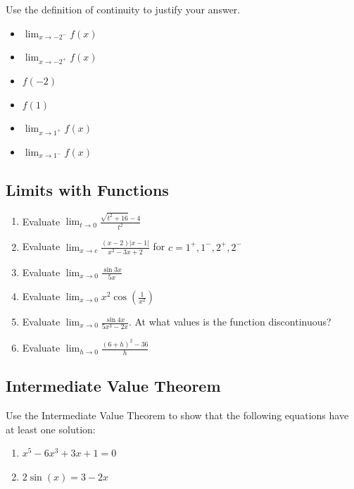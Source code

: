 \documentclass{article}
\begin{document}
\noindent
Use the definition of continuity to justify your answer.
\setlength{\columnsep}{-2.1in}
\begin{multicols}{2}
	\begin{itemize}
		\item $\lim_{x \rightarrow -2^-} f(x)$
		\item $\lim_{x \rightarrow -2^+} f(x)$
		\item $f(-2)$
		\item $f(1)$
		\item $\lim_{x \rightarrow 1^+} f(x)$
		\item $\lim_{x \rightarrow 1^-} f(x)$
	\end{itemize}
\end{multicols}

\pagebreak

\subsection*{Limits with Functions}
\begin{enumerate}
	\item Evaluate $\displaystyle \lim_{t \to 0} \frac{\sqrt{t^2+16} - 4}{t^2}$
	\item Evaluate $\displaystyle \lim_{x \to c} \frac{(x-2)|x-1|}{x^2 -3x +2}$ for $c=1^+, 1^-, 2^+, 2^-$
	\item Evaluate $\displaystyle \lim_{x \to 0}\frac{\sin{3x}}{5x}$
	\item Evaluate $\displaystyle \lim_{x \to 0} x^2 \cos\left(\frac{1}{x^2}\right)$
	\item Evaluate $\displaystyle \lim_{x \to 0} \frac{\sin{4x}}{5x^3-2x}.$ At what values is the function discontinuous?
	\item Evaluate $\displaystyle \lim_{h \to 0}\frac{(6+h)^2-36}{h}$
\end{enumerate}

\vspace{2cm}

\subsection*{Intermediate Value Theorem}

Use the Intermediate Value Theorem to show that the following equations have at least one solution:
\begin{enumerate}
	\item $x^{5}-6x^{3}+3x+1 = 0$
	\item $2\sin(x) = 3 - 2x $	
\end{enumerate}
\end{document}
